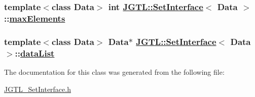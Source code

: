 \hypertarget{class_j_g_t_l_1_1_set_interface_df4c40ad8cc969a8c3b11a93d8bb25c2}{
\subsubsection[maxElements]{\setlength{\rightskip}{0pt plus 5cm}template$<$class Data$>$ int \hyperlink{class_j_g_t_l_1_1_set_interface}{JGTL::Set\-Interface}$<$ Data $>$::\hyperlink{class_j_g_t_l_1_1_set_interface_df4c40ad8cc969a8c3b11a93d8bb25c2}{max\-Elements}}}
\label{class_j_g_t_l_1_1_set_interface_df4c40ad8cc969a8c3b11a93d8bb25c2}


\hypertarget{class_j_g_t_l_1_1_set_interface_67a7d6bcf8d20f0eeb668daad040bd86}{
\subsubsection[dataList]{\setlength{\rightskip}{0pt plus 5cm}template$<$class Data$>$ Data$\ast$ \hyperlink{class_j_g_t_l_1_1_set_interface}{JGTL::Set\-Interface}$<$ Data $>$::\hyperlink{class_j_g_t_l_1_1_set_interface_67a7d6bcf8d20f0eeb668daad040bd86}{data\-List}}}
\label{class_j_g_t_l_1_1_set_interface_67a7d6bcf8d20f0eeb668daad040bd86}




The documentation for this class was generated from the following file:\begin{CompactItemize}
\item 
\hyperlink{_j_g_t_l___set_interface_8h}{JGTL\_\-Set\-Interface.h}\end{CompactItemize}

